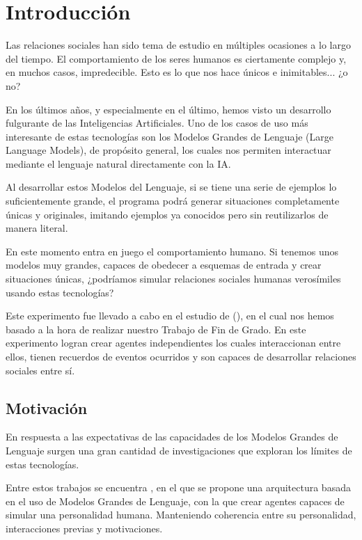 \chapter{Introducción}
\label{cap:introduccion}


Las relaciones sociales han sido tema de estudio en múltiples ocasiones a lo largo del tiempo. El comportamiento de los seres humanos es ciertamente complejo y, en muchos casos, impredecible. Esto es lo que nos hace únicos e inimitables... ¿o no?

En los últimos años, y especialmente en el último, hemos visto un desarrollo fulgurante de las Inteligencias Artificiales. Uno de los casos de uso más interesante de estas tecnologías son los Modelos Grandes de Lenguaje (Large Language Models), de propósito general, los cuales nos permiten interactuar mediante el lenguaje natural directamente con la IA.

Al desarrollar estos Modelos del Lenguaje, si se tiene una serie de ejemplos lo suficientemente grande, el programa podrá generar situaciones completamente únicas y originales, imitando ejemplos ya conocidos pero sin reutilizarlos de manera literal.

En este momento entra en juego el comportamiento humano. Si tenemos unos modelos muy grandes, capaces de obedecer a esquemas de entrada y crear situaciones únicas, ¿podríamos simular relaciones sociales humanas verosímiles usando estas tecnologías?

Este experimento fue llevado a cabo en el estudio de \ga (\cite{park2023generative}), en el cual nos hemos basado a la hora de realizar nuestro Trabajo de Fin de Grado. En este experimento logran crear agentes independientes los cuales interaccionan entre ellos, tienen recuerdos de eventos ocurridos y son capaces de desarrollar relaciones sociales entre sí.

\section{Motivación}
En respuesta a las expectativas de las capacidades de los Modelos Grandes de Lenguaje surgen una gran cantidad de investigaciones que exploran los límites de estas tecnologías.

Entre estos trabajos se encuentra \ga, en el que se propone una arquitectura basada en el uso de Modelos Grandes de Lenguaje, con la que crear agentes capaces de simular una personalidad humana. Manteniendo coherencia entre su personalidad, interacciones previas y motivaciones.

